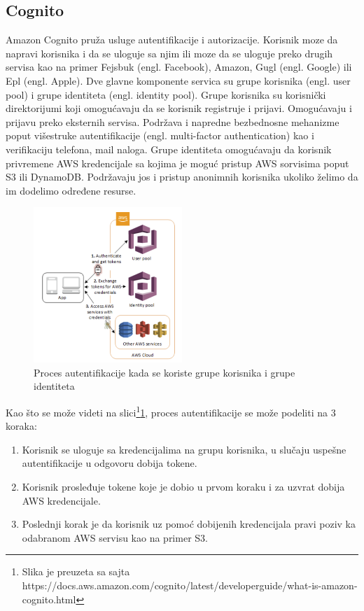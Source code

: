 \documentclass[12pt,oneside]{memoir}
\begin{document}
\subsection{Cognito}
 
Amazon Cognito pruža usluge autentifikacije i autorizacije. Korisnik moze da napravi korisnika i da se uloguje sa njim ili moze da se uloguje preko drugih servisa kao na primer Fejsbuk (engl. Facebook), Amazon, Gugl (engl. Google) ili Epl (engl. Apple). Dve glavne komponente servica su grupe korisnika (engl. user pool) i grupe identiteta (engl. identity pool). Grupe korisnika su korisnički direktorijumi koji omogućavaju da se korisnik registruje i prijavi. Omogućavaju i prijavu preko eksternih servisa. Podržava i napredne bezbednosne mehanizme poput višestruke autentifikacije (engl. multi-factor authentication) kao i verifikaciju telefona, mail naloga. Grupe identiteta omogućavaju da korisnik privremene AWS kredencijale sa kojima je moguć pristup AWS sorvisima poput S3 ili DynamoDB. Podržavaju jos i pristup anonimnih korisnika ukoliko želimo da im dodelimo određene resurse.


\begin{figure}[!ht]
  \centering
  \includegraphics[width=0.5\textwidth]{ProcesAutentifikacije.png}
  \caption{Proces autentifikacije kada se koriste grupe korisnika i grupe identiteta}
  \label{fig:procesAutentifikacije}
\end{figure}

Kao što se može videti na slici\footnote{Slika je preuzeta sa sajta https://docs.aws.amazon.com/cognito/latest/developerguide/what-is-amazon-cognito.html}\ref{fig:procesAutentifikacije}, proces autentifikacije se može podeliti na 3 koraka:
\begin{enumerate}
  \item Korisnik se uloguje sa kredencijalima na grupu korisnika, u slučaju uspešne autentifikacije u odgovoru dobija tokene.
  \item Korisnik prosleđuje tokene koje je dobio u prvom koraku i za uzvrat dobija AWS kredencijale.
  \item Poslednji korak je da korisnik uz pomoć dobijenih kredencijala pravi poziv ka odabranom AWS servisu kao na primer S3.
\end{enumerate}
\end{document}
